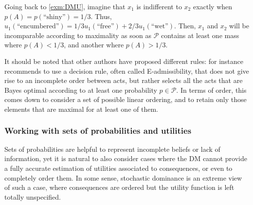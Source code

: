 \documentclass[version=last, pagesize, twocolumn, twoside=off, bibliography=totoc, 12pt, a4paper, english]{scrartcl}
\begin{document}
\begin{example}
	Going back to \cref{exm:DMU}, imagine that $x_1$ is indifferent to $x_2$ exactly when $p(A) = p(\text{“shiny”}) = 1/3$. Thus, $u_1(\text{“encumbered”}) = 1/3 u_1(\text{“free”}) + 2/3 u_1(\text{“wet”})$. Then, $x_1$ and $x_2$ will be incomparable according to maximality as soon as $\mathcal{P}$ contains at least one mass where $p(A) < 1/3$, and another where $p(A) > 1/3$.
\end{example}

It should be noted that other authors have proposed different rules: for instance \citet{levi_enterprise_1983} recommends to use a decision rule, often called E-admissibility, that does not give rise to an incomplete order between acts, but rather selects all the acts that are Bayes optimal according to at least one probability $p \in \mathcal{P}$. In terms of order, this comes down to consider a set of possible linear ordering, and to retain only those elements that are maximal for at least one of them.


\subsubsection{Working with sets of probabilities and utilities}

Sets of probabilities are helpful to represent incomplete beliefs or lack of information, yet it is natural to also consider cases where the \ac{DM} cannot provide a fully accurate estimation of utilities associated to consequences, or even to completely order them. In some sense, stochastic dominance is an extreme view of such a case, where consequences are ordered but the utility function is left totally unspecified. 
	
\end{document}
